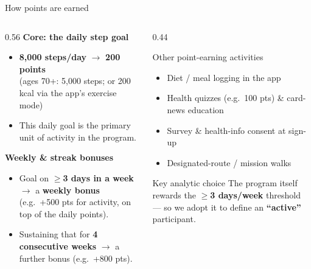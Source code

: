 \documentclass[10pt,aspectratio=169]{beamer}
\newcommand{\hi}[1]{{\color{teal}\bfseries #1}}
\newcommand{\hc}[1]{{\color{coral}\bfseries #1}}
\begin{document}
\begin{frame}{How points are earned}
  \begin{columns}[T]
    \begin{column}{0.56\textwidth}
      \textbf{\color{ink}Core: the daily step goal}
      \begin{itemize}
        \item \hi{8{,}000 steps/day} $\to$ \textbf{200 points} \\ {\footnotesize (ages 70+: 5{,}000 steps; or 200\,kcal via the app's exercise mode)}
        \item This daily goal is the primary unit of activity in the program.
      \end{itemize}
      \vspace*{0.4em}
      \textbf{\color{ink}Weekly \& streak bonuses}
      \begin{itemize}
        \item Goal on \hi{$\geq$3 days in a week} $\to$ a \textbf{weekly bonus} (e.g.\ +500 pts for activity, on top of the daily points).
        \item Sustaining that for \textbf{4 consecutive weeks} $\to$ a further bonus (e.g.\ +800 pts).
      \end{itemize}
    \end{column}
    \begin{column}{0.44\textwidth}
      \begin{block}{Other point-earning activities}
        \begin{itemize}
          \item Diet / meal logging in the app
          \item Health quizzes (e.g.\ 100 pts) \& card-news education
          \item Survey \& health-info consent at sign-up
          \item Designated-route / mission walks
        \end{itemize}
      \end{block}
      \begin{alertblock}{Key analytic choice}
        The program itself rewards the \hc{$\geq$3 days/week} threshold --- so we adopt it to define an \hc{``active''} participant.
      \end{alertblock}
    \end{column}
  \end{columns}
\end{frame}
\end{document}
